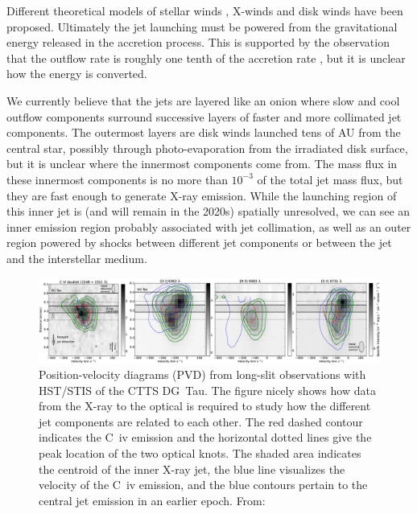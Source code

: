 \documentclass[12pt]{article}
\begin{document}
Different theoretical models of stellar winds \citep{1988ApJ...332L..41K,2005ApJ...632L.135M}, X-winds \citep{1994ApJ...429..781S} and disk winds \citep{1982MNRAS.199..883B,2005ApJ...630..945A} have been proposed. Ultimately the jet launching must be powered from the gravitational energy released in the accretion process. This is supported by the observation that the outflow rate is roughly one tenth of the accretion rate \citep{1990ApJ...354..687C,2008ApJ...689.1112C}, but it is unclear how the energy is converted. 

We currently believe that the jets are layered like an onion where slow and
cool outflow components surround successive layers of faster and more
collimated jet components. The outermost layers are disk winds launched tens of
AU from the central star, possibly through photo-evaporation from the irradiated disk surface, but it is unclear where the innermost components come
from. The mass flux in these innermost components is no more than $10^{-3}$ \citep{2009A&A...493..579G} of
the total jet mass flux, but they are fast enough to generate X-ray emission.
While the launching region of this inner jet is (and will remain in the 2020s) spatially unresolved, we can see an inner \citep[10-40 AU, Fig.~\ref{fig:CIV},][]{2008A&A...488L..13S} emission region probably associated with jet collimation, as well as an outer \citep[hundreds of AU, Fig.~\ref{fig:Xray},][]{2011ASPC..448..617G} region powered by shocks between different jet components or between the jet and the interstellar medium. 

\begin{figure}[htb]
\centering
\includegraphics[width=\textwidth]{aa18592-11-fig2.png}
\caption{Position-velocity diagrams (PVD) from long-slit observations with HST/STIS of the CTTS DG~Tau. The figure nicely shows how data from the X-ray to the optical is required to study how the different jet components are related to each other. The red dashed contour indicates the C~{\sc iv} emission and the horizontal dotted lines give the peak location of the two optical knots. The shaded area indicates the centroid of the inner X-ray jet, the blue line visualizes the velocity of the C~{\sc iv} emission, and the blue contours pertain to the central jet emission in an earlier epoch. From: }
\label{fig:CIV}
\end{figure}
\end{document}
